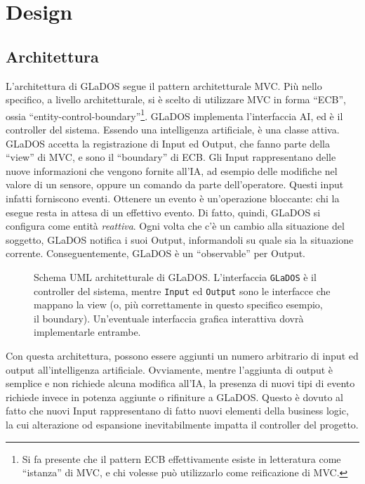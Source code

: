 \documentclass[a4paper,12pt]{report}
\begin{document}
\chapter{Design}

\section{Architettura}

L'architettura di GLaDOS segue il pattern architetturale MVC.
%
Più nello specifico, a livello architetturale, si è scelto di utilizzare MVC in forma ``ECB'', ossia ``entity-control-boundary''\footnote{
Si fa presente che il pattern ECB effettivamente esiste in letteratura come ``istanza'' di MVC, e chi volesse può utilizzarlo come reificazione di MVC.
}.
%
GLaDOS implementa l'interfaccia AI, ed è il controller del sistema.
Essendo una intelligenza artificiale, è una classe attiva.
%
GLaDOS accetta la registrazione di Input ed Output, che fanno parte della ``view'' di MVC, e sono il ``boundary'' di ECB.
Gli Input rappresentano delle nuove informazioni che vengono fornite all'IA, ad esempio delle modifiche nel valore di un sensore, oppure un comando da parte dell'operatore.
Questi input infatti forniscono eventi.
Ottenere un evento è un'operazione bloccante: chi la esegue resta in attesa di un effettivo evento.
Di fatto, quindi, GLaDOS si configura come entità \textit{reattiva}.
Ogni volta che c'è un cambio alla situazione del soggetto, GLaDOS notifica i suoi Output,
informandoli su quale sia la situazione corrente.
%
Conseguentemente, GLaDOS è un ``observable'' per Output.

\begin{figure}[h]
\centering{}
\caption{Schema UML architetturale di GLaDOS. L'interfaccia \texttt{GLaDOS} è il controller del sistema, mentre \texttt{Input} ed \texttt{Output} sono le interfacce che mappano la view (o, più correttamente in questo specifico esempio, il boundary). Un'eventuale interfaccia grafica interattiva dovrà implementarle entrambe.}
\label{img:goodarch}
\end{figure}

Con questa architettura, possono essere aggiunti un numero arbitrario di input ed output
all'intelligenza artificiale.
%
Ovviamente, mentre l'aggiunta di output è semplice e non richiede alcuna modifica all'IA, la
presenza di nuovi tipi di evento richiede invece in potenza aggiunte o rifiniture a GLaDOS.
%
Questo è dovuto al fatto che nuovi Input rappresentano di fatto nuovi elementi della business
logic, la cui alterazione od espansione inevitabilmente impatta il controller del progetto.
\end{document}
